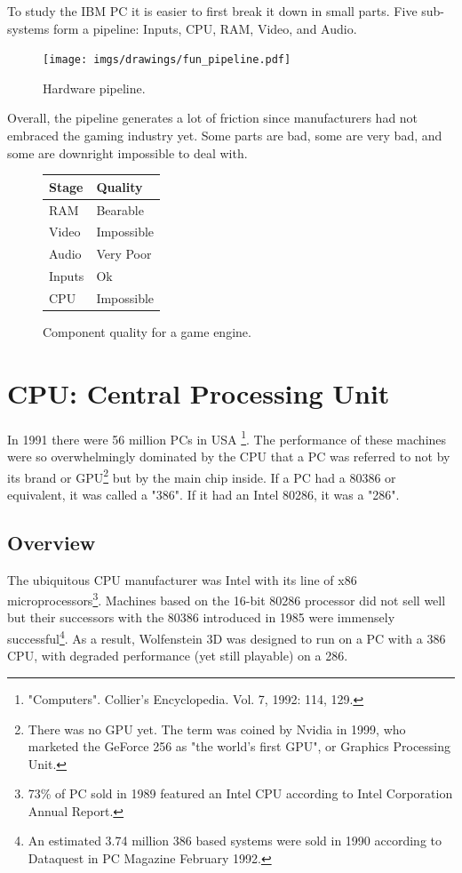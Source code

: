 \documentclass[book.tex]{subfiles}
\begin{document}
To study the IBM PC it is easier to first break it down in small parts. Five sub-systems form a pipeline: Inputs, CPU, RAM, Video, and Audio.\\
\begin{figure}[H]
\centering
\texttt{[image: imgs/drawings/fun\_pipeline.pdf]}
\caption{Hardware pipeline.}
\label{fig:digraph}
\end{figure}

Overall, the pipeline generates a lot of friction since manufacturers had not embraced the gaming industry yet. Some parts are bad, some are very bad, and some are downright impossible to deal with.\\
\par

\begin{figure}[H]
\centering
\begin{tabularx}{\textwidth}{ X X  }
  \toprule
  \textbf{Stage} & \textbf{Quality} \\ \bottomrule
  RAM & Bearable \\ 
  Video & Impossible \\ 
  Audio & Very Poor \\ 
  Inputs & Ok \\ 
  CPU & Impossible \\ \bottomrule
\end{tabularx}
\caption{Component quality for a game engine.}
\end{figure}



\section{CPU: Central Processing Unit}
  
  In 1991 there were 56 million PCs in USA \footnote{"Computers". Collier's Encyclopedia. Vol. 7, 1992: 114, 129.}. The performance of these machines were so overwhelmingly dominated by the CPU that a PC was referred to not by its brand or GPU\footnote{There was no GPU yet. The term was coined by Nvidia in 1999, who marketed the GeForce 256 as "the world's first GPU", or Graphics Processing Unit.} but by the main chip inside. If a PC had a 80386 or equivalent, it was called a "386". If it had an Intel 80286, it was a "286".\\
\subsection{Overview}
  The ubiquitous CPU manufacturer was Intel with its line of x86 microprocessors\footnote{73\% of PC sold in 1989 featured an Intel CPU according to Intel Corporation Annual Report.}. Machines based on the 16-bit 80286 processor did not sell well but their successors with the 80386 introduced in 1985 were immensely successful\footnote{An estimated 3.74 million 386 based systems were sold in 1990 according to Dataquest in PC Magazine February 1992.}. As a result, Wolfenstein 3D was designed to run on a PC with a 386 CPU, with degraded performance (yet still playable) on a 286.\\
\par
\end{document}
